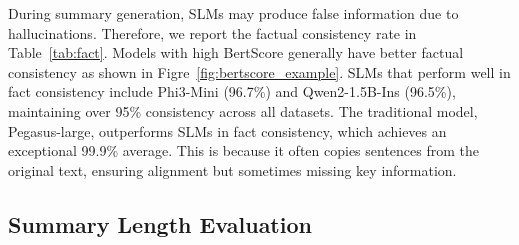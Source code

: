 



During summary generation, SLMs may produce false information due to hallucinations. Therefore, we report the factual consistency rate in Table~\ref{tab:fact}. Models with high BertScore generally have better factual consistency as shown in Figre~\ref{fig:bertscore_example}. SLMs that perform well in fact consistency include Phi3-Mini (96.7\%) and Qwen2-1.5B-Ins (96.5\%), maintaining over 95\% consistency across all datasets. The traditional model, Pegasus-large, outperforms SLMs in fact consistency, which achieves an exceptional 99.9\% average. This is because it often copies sentences from the original text, ensuring alignment but sometimes missing key information. 









\subsection{Summary Length Evaluation}



